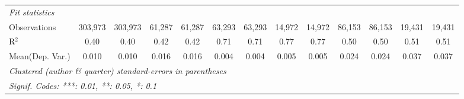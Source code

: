 \begin{tabular}{lcccccccccccc}
   \midrule
   \emph{Fit statistics}\\
   Observations                             & 303,973       & 303,973      & 61,287         & 61,287         & 63,293  & 63,293        & 14,972        & 14,972       & 86,153       & 86,153   & 19,431        & 19,431\\  
   R$^2$                                    & 0.40          & 0.40         & 0.42           & 0.42           & 0.71    & 0.71          & 0.77          & 0.77         & 0.50         & 0.50     & 0.51          & 0.51\\  
Mean(Dep. Var.) & 0.010 & 0.010 & 0.016 & 0.016 & 0.004 & 0.004 & 0.005 & 0.005 & 0.024 & 0.024 & 0.037 & 0.037 \\
   \midrule \midrule
   \multicolumn{13}{l}{\emph{Clustered (author \& quarter) standard-errors in parentheses}}\\
   \multicolumn{13}{l}{\emph{Signif. Codes: ***: 0.01, **: 0.05, *: 0.1}}\\
\end{tabular}
\par\endgroup
